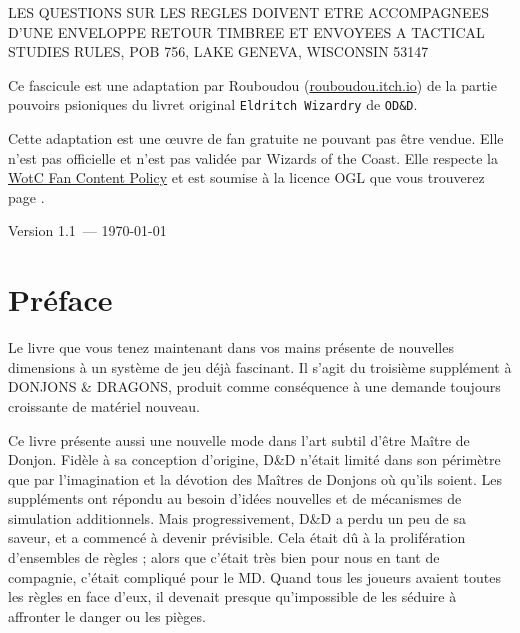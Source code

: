 \documentclass[11pt]{article}
\newcommand{\myversion}{1.1}
\begin{document}
\vfill

{\small \noindent LES QUESTIONS SUR LES REGLES DOIVENT ETRE ACCOMPAGNEES D'UNE ENVELOPPE RETOUR TIMBREE ET ENVOYEES A TACTICAL STUDIES RULES, POB 756, LAKE GENEVA, WISCONSIN 53147}


\newpage
\phantom{-}

\vfill

{\small Ce fascicule est une adaptation par Rouboudou (\href{https://rouboudou.itch.io}{rouboudou.itch.io}) de la partie pouvoirs psioniques du livret original \texttt{Eldritch Wizardry} de \texttt{OD\&D}.}

{\small Cette adaptation est une œuvre de fan gratuite ne pouvant pas être vendue. Elle n'est pas officielle et n'est pas validée par Wizards of the Coast. Elle respecte la \href{https://company.wizards.com/en/legal/fancontentpolicy}{WotC Fan Content Policy} et est soumise à la licence OGL que vous trouverez page \pageref{OGL}.}

\begin{center}
{\small Version \myversion\ --- \today}
\end{center}

\newpage

\section*{Préface}

Le livre que vous tenez maintenant dans vos mains présente de nouvelles dimensions à un système de jeu déjà fascinant. Il s'agit du troisième supplément à DONJONS \& DRAGONS, produit comme conséquence à une demande toujours croissante de matériel nouveau.

Ce livre présente aussi une nouvelle mode dans l'art subtil d'être Maître de Donjon. Fidèle à sa conception d'origine, D\&D n'était limité dans son périmètre que par l'imagination et la dévotion des Maîtres de Donjons où qu'ils soient. Les suppléments ont répondu au besoin d'idées nouvelles et de mécanismes de simulation additionnels. Mais progressivement, D\&D a perdu un peu de sa saveur, et a commencé à devenir prévisible. Cela était dû à la prolifération d'ensembles de règles ; alors que c'était très bien pour nous en tant de compagnie, c'était compliqué pour le MD. Quand tous les joueurs avaient toutes les règles en face d'eux, il devenait presque qu'impossible de les séduire à affronter le danger ou les pièges.
\end{document}

